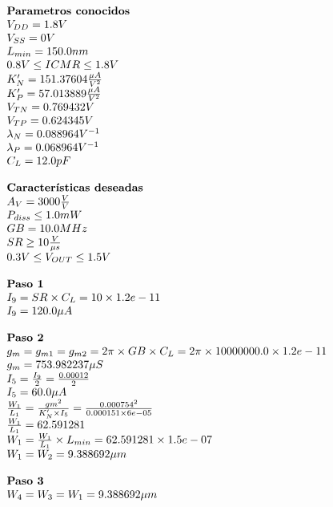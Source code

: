\begin{equation*}
	\begin{array}{l l}
		\textbf{Parametros conocidos} \\
		V_{DD} =  1.8  V \\
		V_{SS} =  0  V \\
		L_{min} =  150.0  nm \\
		0.8 V \leq ICMR \leq 1.8 V \\
		K'_{N} =  151.37604  \frac{\mu A}{V^{2}} \\
		K'_{P} =  57.013889  \frac{\mu A}{V^{2}} \\
		V_{TN} =  0.769432  V \\
		V_{TP} =  0.624345  V \\
		\lambda_{N} =  0.088964  V^{-1} \\
		\lambda_{P} =  0.068964  V^{-1} \\
		C_{L} =  12.0  pF \\
		\\
		\textbf{Características deseadas} \\
		A_{V} =  3000  \frac{V}{V} \\
		P_{diss} \leq  1.0  mW \\
		GB =  10.0  MHz \\
		SR \geq  10  \frac{V}{\mu s} \\
		0.3 V \leq V_{OUT} \leq 1.5 V \\
		\\
		\textbf{Paso 1} \\
		I_{9} = SR \times C_{L} = 10\times1.2e-11 \\
		I_{9} =  120.0 \mu A \\
		\\
		\textbf{Paso 2} \\
		g_{m} = g_{m1} = g_{m2} = 2\pi{} \times GB \times C_{L} = 2 \pi{} \times10000000.0\times 1.2e-11  \\
		g_{m} =  753.982237  \mu S \\
		I_{5} = \frac{I_{9}}{2} = \frac{ 0.00012 }{2} \\
		I_{5} =  60.0 \mu A \\
		\frac{W_1}{L_1} = \frac{gm^2}{K'_{N}\times I_5} = \frac{0.000754^2}{0.000151\times6e-05}\\
		\frac{W_1}{L_1} =  62.591281  \\
		W_{1} = \frac{W_1}{L_1} \times L_{min} =  62.591281 \times 1.5e-07  \\
		W_{1} = W_{2} =  9.388692  \mu m \\
		\\
		\textbf{Paso 3} \\
		W_{4} = W_{3} = W_{1} =  9.388692  \mu m \\
	\end{array}
\end{equation*}

